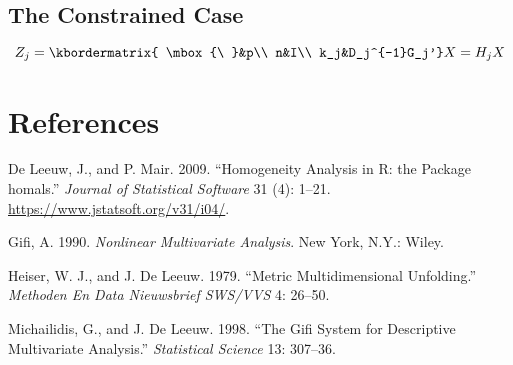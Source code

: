 \documentclass[
  12pt,
]{article}
\newlength{\cslhangindent}
\newenvironment{CSLReferences}[2] %
 {\begin{list}{}{%
  \setlength{\itemindent}{0pt}
  \setlength{\leftmargin}{0pt}
  \setlength{\parsep}{0pt}
  \ifodd #1
   \setlength{\leftmargin}{\cslhangindent}
   \setlength{\itemindent}{-1\cslhangindent}
  \fi
  \setlength{\itemsep}{#2\baselineskip}}}
 {\end{list}}
\begin{document}
\subsection{The Constrained Case}\label{the-constrained-case}

\[
Z_j=
\kbordermatrix{
\mbox{\ }&p\\
n&I\\
k_j&D_j^{-1}G_j'}X=H_jX
\]

\section*{References}\label{references}

\label{refs}
\begin{CSLReferences}{1}{0}
De Leeuw, J., and P. Mair. 2009. {``{Homogeneity Analysis in {R}: the Package homals}.''} \emph{Journal of Statistical Software} 31 (4): 1--21. \url{https://www.jstatsoft.org/v31/i04/}.

Gifi, A. 1990. \emph{Nonlinear Multivariate Analysis}. New York, N.Y.: Wiley.

Heiser, W. J., and J. De Leeuw. 1979. {``Metric Multidimensional Unfolding.''} \emph{Methoden En Data Nieuwsbrief SWS/VVS} 4: 26--50.

Michailidis, G., and J. De Leeuw. 1998. {``The Gifi System for Descriptive Multivariate Analysis.''} \emph{Statistical Science} 13: 307--36.

\end{CSLReferences}
\end{document}
